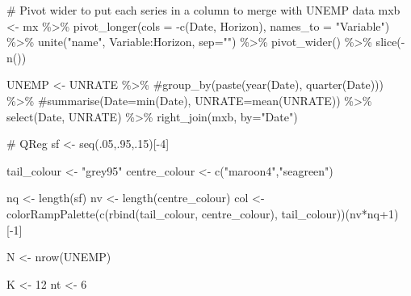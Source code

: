 \documentclass[
  letterpaper,
]{book}
\newenvironment{Shaded}{\begin{snugshade}}{\end{snugshade}}
\newcommand{\AttributeTok}[1]{\textcolor[rgb]{0.40,0.45,0.13}{#1}}
\newcommand{\CommentTok}[1]{\textcolor[rgb]{0.37,0.37,0.37}{#1}}
\newcommand{\DecValTok}[1]{\textcolor[rgb]{0.68,0.00,0.00}{#1}}
\newcommand{\FunctionTok}[1]{\textcolor[rgb]{0.28,0.35,0.67}{#1}}
\newcommand{\NormalTok}[1]{\textcolor[rgb]{0.00,0.23,0.31}{#1}}
\newcommand{\OtherTok}[1]{\textcolor[rgb]{0.00,0.23,0.31}{#1}}
\newcommand{\SpecialCharTok}[1]{\textcolor[rgb]{0.37,0.37,0.37}{#1}}
\newcommand{\StringTok}[1]{\textcolor[rgb]{0.13,0.47,0.30}{#1}}
\begin{document}
\begin{Shaded}
\begin{Highlighting}[]
\CommentTok{\# Pivot wider to put each series in a column to merge with UNEMP data}
\NormalTok{mxb }\OtherTok{\textless{}{-}}\NormalTok{ mx }\SpecialCharTok{\%\textgreater{}\%}
  \FunctionTok{pivot\_longer}\NormalTok{(}\AttributeTok{cols =} \SpecialCharTok{{-}}\FunctionTok{c}\NormalTok{(Date, Horizon), }\AttributeTok{names\_to =} \StringTok{"Variable"}\NormalTok{) }\SpecialCharTok{\%\textgreater{}\%}
  \FunctionTok{unite}\NormalTok{(}\StringTok{"name"}\NormalTok{, Variable}\SpecialCharTok{:}\NormalTok{Horizon, }\AttributeTok{sep=}\StringTok{""}\NormalTok{) }\SpecialCharTok{\%\textgreater{}\%}
  \FunctionTok{pivot\_wider}\NormalTok{() }\SpecialCharTok{\%\textgreater{}\%}
  \FunctionTok{slice}\NormalTok{(}\SpecialCharTok{{-}}\FunctionTok{n}\NormalTok{())}

\NormalTok{UNEMP }\OtherTok{\textless{}{-}}\NormalTok{ UNRATE }\SpecialCharTok{\%\textgreater{}\%}
  \CommentTok{\#group\_by(paste(year(Date), quarter(Date))) \%\textgreater{}\%}
  \CommentTok{\#summarise(Date=min(Date), UNRATE=mean(UNRATE)) \%\textgreater{}\%}
  \FunctionTok{select}\NormalTok{(Date, UNRATE) }\SpecialCharTok{\%\textgreater{}\%}
  \FunctionTok{right\_join}\NormalTok{(mxb, }\AttributeTok{by=}\StringTok{"Date"}\NormalTok{)}

\CommentTok{\# QReg }
\NormalTok{sf }\OtherTok{\textless{}{-}} \FunctionTok{seq}\NormalTok{(.}\DecValTok{05}\NormalTok{,.}\DecValTok{95}\NormalTok{,.}\DecValTok{15}\NormalTok{)[}\SpecialCharTok{{-}}\DecValTok{4}\NormalTok{]}

\NormalTok{tail\_colour   }\OtherTok{\textless{}{-}} \StringTok{"grey95"}
\NormalTok{centre\_colour }\OtherTok{\textless{}{-}} \FunctionTok{c}\NormalTok{(}\StringTok{"maroon4"}\NormalTok{,}\StringTok{"seagreen"}\NormalTok{)}

\NormalTok{nq  }\OtherTok{\textless{}{-}} \FunctionTok{length}\NormalTok{(sf)}
\NormalTok{nv  }\OtherTok{\textless{}{-}} \FunctionTok{length}\NormalTok{(centre\_colour)}
\NormalTok{col }\OtherTok{\textless{}{-}} \FunctionTok{colorRampPalette}\NormalTok{(}\FunctionTok{c}\NormalTok{(}\FunctionTok{rbind}\NormalTok{(tail\_colour, centre\_colour), tail\_colour))(nv}\SpecialCharTok{*}\NormalTok{nq}\SpecialCharTok{+}\DecValTok{1}\NormalTok{)[}\SpecialCharTok{{-}}\DecValTok{1}\NormalTok{]}

\NormalTok{N   }\OtherTok{\textless{}{-}} \FunctionTok{nrow}\NormalTok{(UNEMP)}

\NormalTok{K   }\OtherTok{\textless{}{-}} \DecValTok{12}
\NormalTok{nt  }\OtherTok{\textless{}{-}} \DecValTok{6}


\end{Highlighting}
\end{Shaded}
\end{document}
